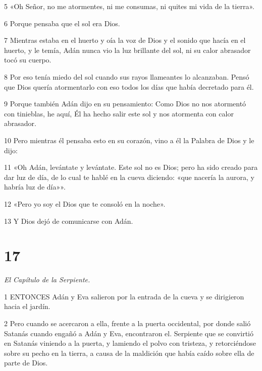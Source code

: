 \par 5 «Oh Señor, no me atormentes, ni me consumas, ni quites mi vida de la tierra».

\par 6 Porque pensaba que el sol era Dios.

\par 7 Mientras estaba en el huerto y oía la voz de Dios y el sonido que hacía en el huerto, y le temía, Adán nunca vio la luz brillante del sol, ni su calor abrasador tocó su cuerpo.

\par 8 Por eso tenía miedo del sol cuando sus rayos llameantes lo alcanzaban. Pensó que Dios quería atormentarlo con eso todos los días que había decretado para él.

\par 9 Porque también Adán dijo en su pensamiento: Como Dios no nos atormentó con tinieblas, he aquí, Él ha hecho salir este sol y nos atormenta con calor abrasador.

\par 10 Pero mientras él pensaba esto en su corazón, vino a él la Palabra de Dios y le dijo:

\par 11 «Oh Adán, levántate y levántate. Este sol no es Dios; pero ha sido creado para dar luz de día, de lo cual te hablé en la cueva diciendo: «que nacería la aurora, y habría luz de día»».

\par 12 «Pero yo soy el Dios que te consoló en la noche».

\par 13 Y Dios dejó de comunicarse con Adán.



\chapter{17}

\par \textit{El Capítulo de la Serpiente.}

\par 1 ENTONCES Adán y Eva salieron por la entrada de la cueva y se dirigieron hacia el jardín.

\par 2 Pero cuando se acercaron a ella, frente a la puerta occidental, por donde salió Satanás cuando engañó a Adán y Eva, encontraron el. Serpiente que se convirtió en Satanás viniendo a la puerta, y lamiendo el polvo con tristeza, y retorciéndose sobre su pecho en la tierra, a causa de la maldición que había caído sobre ella de parte de Dios.

